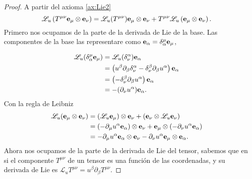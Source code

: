 \begin{proof}
    A partir del axioma \ref{ax:Lie2}
    \begin{equation}
        \mathscr{L}_u \left( T^{\mu \nu} \mathbf{e_\mu} \otimes \mathbf{e_\nu} \right) = \mathscr{L}_u(T^{\mu \nu}) \mathbf{e_\mu} \otimes \mathbf{e_\nu} + T^{\mu \nu} \mathscr{L}_u \left( \mathbf{e_\mu} \otimes \mathbf{e_\nu} \right).
    \end{equation}
    Primero nos ocupamos de la parte de la derivada de Lie de la base.
    Las componentes de la base las representare como $\mathbf{e_\alpha} = \delta^\mu_\alpha \mathbf{e_\mu} $,


    \begin{equation}
        \begin{aligned}
            \mathscr{L}_u (\delta^\mu_\alpha \mathbf{e_\mu}) & = \mathscr{L}_u (\delta^\alpha_\nu) \mathbf{e_\alpha}                                                                  \\
                                                        & = \left( u^\beta \partial_\beta \delta^\alpha_\nu - \delta^\beta_\nu \partial_\beta u^\alpha \right) \mathbf{e_\alpha} \\
                                                        & = \left(  - \delta^\beta_\nu \partial_\beta u^\alpha \right) \mathbf{e_\alpha}                                         \\
                                                        & = - (\partial_\nu u^\alpha) \mathbf{e_\alpha}   .                                                                      \\
        \end{aligned}
    \end{equation}
    Con la regla de Leibniz
    \begin{equation}
        \begin{aligned}
            \mathscr{L}_u (\mathbf{e_\mu} \otimes \mathbf{e_\nu}) & = (\mathscr{L}_u \mathbf{e_\mu}) \otimes  \mathbf{e_\nu} +(\mathbf{e_\nu}\otimes\mathscr{L}_u \mathbf{e_\nu})                                                      \\
                                                        & = \left( - \partial_\mu u^\alpha \mathbf{e_\alpha} \right) \otimes  \mathbf{e_\nu} + \mathbf{e_\mu}\otimes\left( - \partial_\nu u^\alpha \mathbf{e_\alpha} \right) \\
                                                        & = - \partial_\mu u^\alpha \mathbf{e_\alpha} \otimes  \mathbf{e_\nu} - \partial_\nu u^\alpha \mathbf{e_\mu}\otimes\mathbf{e_\alpha}      .                          \\
        \end{aligned}
    \end{equation}
    Ahora nos ocupamos de la parte de la derivada de Lie del tensor, sabemos que en si el componente $T^{\mu \nu}$ de un tensor es una función de las coordenadas, y su derivada de Lie es $\mathscr{L}_u T^{\mu \nu} = u^\beta \partial_\beta T^{\mu \nu} $.


\end{proof}
